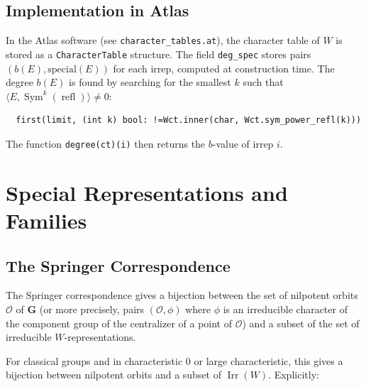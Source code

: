 \documentclass[12pt]{amsart}
\newcommand{\Sym}{\operatorname{Sym}}
\newcommand{\refl}{\operatorname{refl}}
\newcommand{\Irr}{\operatorname{Irr}}
\newcommand{\bfG}{\mathbf{G}}
\newcommand{\cO}{\mathcal{O}}
\begin{document}
\subsection{Implementation in Atlas}

In the Atlas software (see \texttt{character\_tables.at}), the character table
of $W$ is stored as a \texttt{CharacterTable} structure.  The field
\texttt{deg\_spec} stores pairs $(b(E), \text{special}(E))$ for each irrep,
computed at construction time.  The degree $b(E)$ is found by searching for the
smallest $k$ such that $\langle E, \Sym^k(\refl) \rangle \neq 0$:
\begin{verbatim}
  first(limit, (int k) bool: !=Wct.inner(char, Wct.sym_power_refl(k)))
\end{verbatim}
The function \texttt{degree(ct)(i)} then returns the $b$-value of irrep $i$.

\section{Special Representations and Families}

\subsection{The Springer Correspondence}

The Springer correspondence \cite{Springer:1978} gives a bijection between the
set of nilpotent orbits $\cO$ of $\bfG$ (or more precisely, pairs $(\cO, \phi)$
where $\phi$ is an irreducible character of the component group of the
centralizer of a point of $\cO$) and a subset of the set of irreducible
$W$-representations.

For classical groups and in characteristic $0$ or large characteristic, this
gives a bijection between nilpotent orbits and a subset of $\Irr(W)$.
Explicitly:
\end{document}
